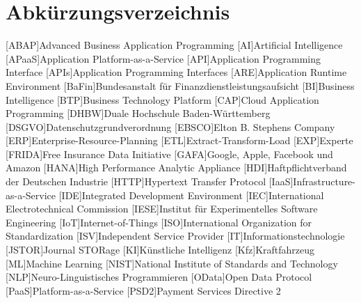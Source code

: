 \clearpage
\chapter*{Abkürzungsverzeichnis}	

\begin{acronym}[XXXXXXX]
	[ABAP]{Advanced Business Application Programming}
	[AI]{Artificial Intelligence}
	[APaaS]{Application Platform-as-a-Service}
	[API]{Application Programming Interface}
	[APIs]{Application Programming Interfaces}	
	[ARE]{Application Runtime Environment}
	[BaFin]{Bundesanstalt für Finanzdienstleistungsaufsicht}
	[BI]{Business Intelligence}
	[BTP]{Business Technology Platform}
	[CAP]{Cloud Application Programming}
	[DHBW]{Duale Hochschule Baden-Württemberg}
	[DSGVO]{Datenschutzgrundverordnung}
	[EBSCO]{Elton B. Stephens Company}
	[ERP]{Enterprise-Resource-Planning}
	[ETL]{Extract-Transform-Load}
	[EXP]{Experte}
	[FRIDA]{Free Insurance Data Initiative}
	[GAFA]{Google, Apple, Facebook und Amazon}
	[HANA]{High Performance Analytic Appliance}
	[HDI]{Haftpflichtverband der Deutschen Industrie}
	[HTTP]{Hypertext Transfer Protocol}
	[IaaS]{Infrastructure-as-a-Service}
	[IDE]{Integrated Development Environment}
	[IEC]{International Electrotechnical Commission}
	[IESE]{Institut für Experimentelles Software Engineering}
	[IoT]{Internet-of-Things}
	[ISO]{International Organization for Standardization}
	[ISV]{Independent Service Provider}
	[IT]{Informationstechnologie}
	[JSTOR]{Journal STORage}
	[KI]{Künstliche Intelligenz}
	[Kfz]{Kraftfahrzeug}
	[ML]{Machine Learning}
	[NIST]{National Institute of Standards and Technology}
	[NLP]{Neuro-Linguistisches Programmieren}
	[OData]{Open Data Protocol}
	[PaaS]{Platform-as-a-Service}
	[PSD2]{Payment Services Directive 2}

\end{acronym}
